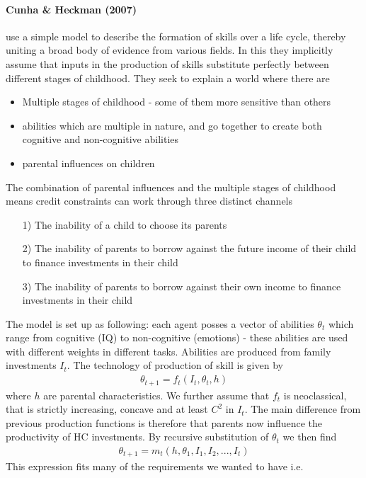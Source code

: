 \documentclass[12pt, a4paper]{article}
\begin{document}
\begin{multicols}{2}
\paragraph{Cunha \& Heckman (2007)} use a simple model to describe the formation of skills over a life cycle, thereby uniting a broad body of evidence from various fields. In this they implicitly assume that inputs in the production of skills substitute perfectly between different stages of childhood. They seek to explain a world where there are
\begin{itemize}
\item Multiple stages of childhood - some of them more sensitive than others
\item abilities which are multiple in nature, and go together to create both cognitive and non-cognitive abilities
\item parental influences on children
\end{itemize}
The combination of parental influences and the multiple stages of childhood means credit constraints can work through three distinct channels
\begin{itemize}
\item[1)] The inability of a child to choose its parents 
\item[2)] The inability of parents to borrow against the future income of their child to finance investments in their child
\item[3)] The inability of parents to borrow against their own income to finance investments in their child
\end{itemize}
The model is set up as following: each agent posses a vector of abilities $\theta_t$ which range from cognitive (IQ) to non-cognitive (emotions) - these abilities are used with different weights in different tasks. Abilities are produced from family investments $I_t$. The technology of production of skill is given by
\begin{align*}
\theta_{t+1} = f_t(I_t, \theta_t, h)
\end{align*}
where $h$ are parental characteristics. We further assume that $f_t$ is neoclassical, that is strictly increasing, concave and at least $C^2$ in $I_t$. The main difference from previous production functions is therefore that parents now influence the productivity of HC investments. By recursive substitution of $\theta_t$ we then find
\begin{align*}
\theta_{t+1} = m_t(h, \theta_1, I_1, I_2, ..., I_t)
\end{align*}
This expression fits many of the requirements we wanted to have i.e.

\end{multicols}
\end{document}

